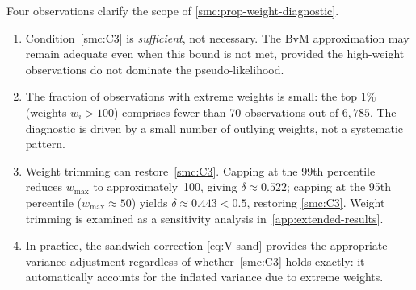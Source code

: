 \begin{remark}
\label{smc:rem-weight-interpretation}
  Four observations clarify the scope of
  \cref{smc:prop-weight-diagnostic}.
  \begin{enumerate}[label=\textup{(\alph*)},nosep]
    \item Condition~\ref{smc:C3} is \emph{sufficient}, not necessary.
      The BvM approximation may remain adequate even when this bound is
      not met, provided the high-weight observations do not dominate
      the pseudo-likelihood.
    \item The fraction of observations with extreme weights is small:
      the top $1\%$ (weights $w_i > 100$) comprises fewer than 70
      observations out of $6{,}785$.  The diagnostic is driven by a
      small number of outlying weights, not a systematic pattern.
    \item Weight trimming can restore~\ref{smc:C3}.  Capping at the
      99th percentile reduces $w_{\max}$ to approximately~100, giving
      $\delta \approx 0.522$; capping at the 95th percentile
      ($w_{\max} \approx 50$) yields $\delta \approx 0.443 < 0.5$,
      restoring \ref{smc:C3}.  Weight trimming is examined as a
      sensitivity analysis in~\cref{app:extended-results}.
    \item In practice, the sandwich correction
      \eqref{eq:V-sand} provides the appropriate variance adjustment
      regardless of whether~\ref{smc:C3} holds exactly: it
      automatically accounts for the inflated variance due to extreme
      weights.
  \end{enumerate}
\end{remark}


